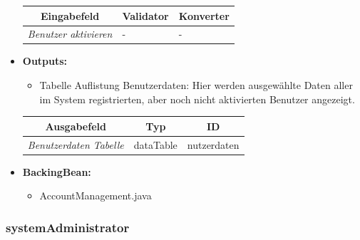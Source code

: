 \begin{itemize}
				\begin{center}
					\begin{longtable}{|p{3cm} |p{8cm} | p{5cm}|}
						
						\hline \multicolumn{1}{|c|}{\textbf{Eingabefeld}} & \multicolumn{1}{|c|}{\textbf{Validator}} & \multicolumn{1}{|c|}{\textbf{Konverter}} \\ \hline
						\endfirsthead
						\hline
						\endlastfoot
						\textit{Benutzer aktivieren} & - & - \\ \hline
					\end{longtable}
				\end{center}
				
			\item \textbf{Outputs:}
				\begin{itemize}
					\item Tabelle Auflistung Benutzerdaten: Hier werden ausgewählte Daten aller im System registrierten, aber noch nicht aktivierten Benutzer angezeigt.
				\end{itemize}
				
					\begin{center}
						\begin{longtable}{|p{5cm} | p{4cm}|p{3cm}|}
							
							\hline \multicolumn{1}{|c|}{\textbf{Ausgabefeld}} & \multicolumn{1}{|c|}{\textbf{Typ}}  &  \multicolumn{1}{|c|}{\textbf{ID}} \\ \hline
							\endfirsthead
							\hline
							\endlastfoot
							\textit{Benutzerdaten Tabelle}  & dataTable & nutzerdaten \\ \hline
						\end{longtable}
					\end{center}
				
			\item \textbf{BackingBean:}
				\begin{itemize}
					\item AccountManagement.java
				\end{itemize}
		\end{itemize}
		
		\subsubsection{systemAdministrator}
		
